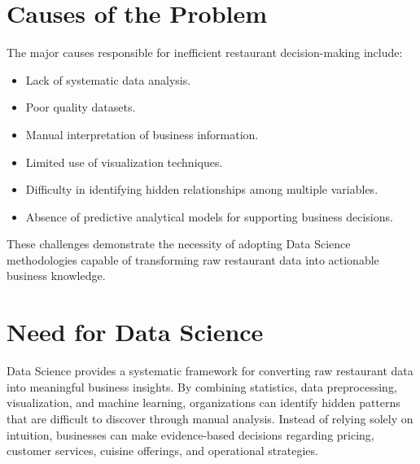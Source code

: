 \documentclass[12pt,a4paper]{report}
\begin{document}
\section{Causes of the Problem}

The major causes responsible for inefficient restaurant decision-making include:

\begin{itemize}

\item Lack of systematic data analysis.

\item Poor quality datasets.

\item Manual interpretation of business information.

\item Limited use of visualization techniques.

\item Difficulty in identifying hidden relationships among multiple variables.

\item Absence of predictive analytical models for supporting business decisions.

\end{itemize}

These challenges demonstrate the necessity of adopting Data Science methodologies capable of transforming raw restaurant data into actionable business knowledge.



\section{Need for Data Science}

Data Science provides a systematic framework for converting raw restaurant data into meaningful business insights. By combining statistics, data preprocessing, visualization, and machine learning, organizations can identify hidden patterns that are difficult to discover through manual analysis. Instead of relying solely on intuition, businesses can make evidence-based decisions regarding pricing, customer services, cuisine offerings, and operational strategies.
\end{document}
